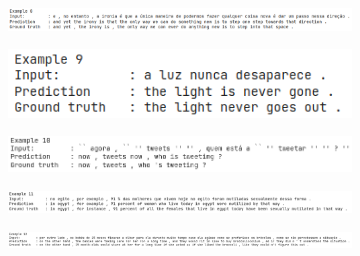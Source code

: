 \documentclass[12pt, a4paper]{book}
\begin{document}
\begin{figure}[h]
    \ContinuedFloat
    \begin{subfigure}{\linewidth}
        \begin{flushright}
        \includegraphics[width=\linewidth]{images/examples/9.png}
        \end{flushright}
    \end{subfigure}
    \break
    \begin{subfigure}{\linewidth}
        \begin{flushright}
        \includegraphics[width=\linewidth]{images/examples/10.png}
        \end{flushright}
    \end{subfigure}
    \break
    \begin{subfigure}{\linewidth}
        \begin{flushright}
        \includegraphics[width=\linewidth]{images/examples/11.png}
        \end{flushright}
    \end{subfigure}
    \break
    \begin{subfigure}{\linewidth}
        \begin{flushright}
        \includegraphics[width=\linewidth]{images/examples/12.png}
        \end{flushright}
    \end{subfigure}
    \break
    \begin{subfigure}{\linewidth}
        \begin{flushright}
        \includegraphics[width=\linewidth]{images/examples/13.png}

\end{flushright}
\end{subfigure}
\end{figure}
\end{document}
